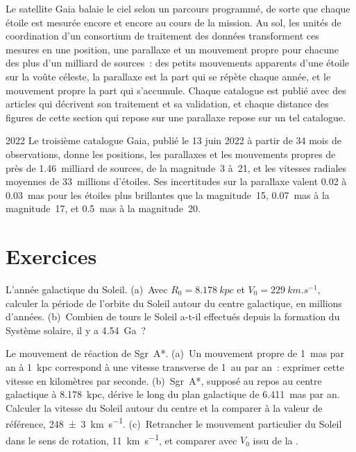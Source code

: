 \begin{inthelab}
Le satellite Gaia balaie le ciel selon un parcours programmé, de sorte que chaque
étoile est mesurée encore et encore au cours de la mission. Au sol, les
unités de coordination d'un consortium de traitement des données transforment ces
mesures en une position, une parallaxe et un mouvement propre pour chacune des
plus d'un milliard de sources~: des petits mouvements apparents d'une étoile sur la voûte céleste,
la parallaxe est la part qui se répète chaque année, et le mouvement propre
la part qui s'accumule. Chaque catalogue est publié avec des articles qui
décrivent son traitement et sa validation, et chaque distance des
figures de cette section qui repose sur une parallaxe repose sur un tel
catalogue.
\end{inthelab}

\begin{dated}{2022}
Le troisième catalogue Gaia, publié le 13 juin 2022 à partir de 34 mois de
observations, donne les positions, les parallaxes et les mouvements propres de près de
1.46~milliard de sources, de la magnitude~3 à~21, et les vitesses radiales moyennes
de 33~millions d'étoiles. Ses incertitudes sur la parallaxe valent 0.02 à
\qty{0.03}{mas} pour les étoiles plus brillantes que la magnitude~15, \qty{0.07}{mas} à
la magnitude~17, et \qty{0.5}{mas} à la magnitude~20.
\end{dated}

\section{Exercices}

\begin{exercise}[$\star$]\label{exo:b3:milky-way-galaxies:1}
L'année galactique du Soleil. (a)~Avec $R_0 = \qty{8.178}{kpc}$ et
$V_0 = \qty{229}{km.s^{-1}}$, calculer la période de l'orbite du Soleil
autour du centre galactique, en millions d'années. (b)~Combien de tours le Soleil a-t-il
effectués depuis la formation du Système solaire, il y a \qty{4.54}{Ga}~?
\end{exercise}

\begin{exercise}[$\star$]\label{exo:b3:milky-way-galaxies:2}
Le mouvement de réaction de Sgr~A*. (a)~Un mouvement propre de \qty{1}{mas} par an
à \qty{1}{kpc} correspond à une vitesse transverse de \qty{1}{au} par an~: exprimer cette vitesse en
kilomètres par seconde. (b)~Sgr~A*, supposé au repos au centre galactique
à \qty{8.178}{kpc}, dérive le long du plan galactique de \qty{6.411}{mas}
par an. Calculer la vitesse du Soleil autour du centre et la comparer à la
valeur de référence, \qty[separate-uncertainty=true]{248 \pm 3}{km.s^{-1}}. (c)~Retrancher le
mouvement particulier du Soleil dans le sens de rotation, \qty{11}{km.s^{-1}}, et
comparer avec $V_0$ issu de la .
\end{exercise}

